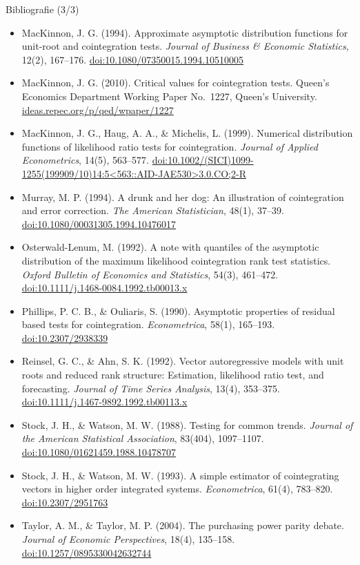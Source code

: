 \begin{frame}{Bibliografie (3/3)}
\itemsize{\scriptsize}
\begin{itemize}
    \item MacKinnon, J. G. (1994). Approximate asymptotic distribution functions for unit-root and cointegration tests. \textit{Journal of Business \& Economic Statistics}, 12(2), 167--176. \href{https://doi.org/10.1080/07350015.1994.10510005}{doi:10.1080/07350015.1994.10510005}
    \item MacKinnon, J. G. (2010). Critical values for cointegration tests. Queen's Economics Department Working Paper No.~1227, Queen's University. \href{https://ideas.repec.org/p/qed/wpaper/1227.html}{ideas.repec.org/p/qed/wpaper/1227}
    \item MacKinnon, J. G., Haug, A. A., \& Michelis, L. (1999). Numerical distribution functions of likelihood ratio tests for cointegration. \textit{Journal of Applied Econometrics}, 14(5), 563--577. \href{https://doi.org/10.1002/(SICI)1099-1255(199909/10)14:5<563::AID-JAE530>3.0.CO;2-R}{doi:10.1002/(SICI)1099-1255(199909/10)14:5<563::AID-JAE530>3.0.CO;2-R}
    \item Murray, M. P. (1994). A drunk and her dog: An illustration of cointegration and error correction. \textit{The American Statistician}, 48(1), 37--39. \href{https://doi.org/10.1080/00031305.1994.10476017}{doi:10.1080/00031305.1994.10476017}
    \item Osterwald-Lenum, M. (1992). A note with quantiles of the asymptotic distribution of the maximum likelihood cointegration rank test statistics. \textit{Oxford Bulletin of Economics and Statistics}, 54(3), 461--472. \href{https://doi.org/10.1111/j.1468-0084.1992.tb00013.x}{doi:10.1111/j.1468-0084.1992.tb00013.x}
    \item Phillips, P. C. B., \& Ouliaris, S. (1990). Asymptotic properties of residual based tests for cointegration. \textit{Econometrica}, 58(1), 165--193. \href{https://doi.org/10.2307/2938339}{doi:10.2307/2938339}
    \item Reinsel, G. C., \& Ahn, S. K. (1992). Vector autoregressive models with unit roots and reduced rank structure: Estimation, likelihood ratio test, and forecasting. \textit{Journal of Time Series Analysis}, 13(4), 353--375. \href{https://doi.org/10.1111/j.1467-9892.1992.tb00113.x}{doi:10.1111/j.1467-9892.1992.tb00113.x}
    \item Stock, J. H., \& Watson, M. W. (1988). Testing for common trends. \textit{Journal of the American Statistical Association}, 83(404), 1097--1107. \href{https://doi.org/10.1080/01621459.1988.10478707}{doi:10.1080/01621459.1988.10478707}
    \item Stock, J. H., \& Watson, M. W. (1993). A simple estimator of cointegrating vectors in higher order integrated systems. \textit{Econometrica}, 61(4), 783--820. \href{https://doi.org/10.2307/2951763}{doi:10.2307/2951763}
    \item Taylor, A. M., \& Taylor, M. P. (2004). The purchasing power parity debate. \textit{Journal of Economic Perspectives}, 18(4), 135--158. \href{https://doi.org/10.1257/0895330042632744}{doi:10.1257/0895330042632744}
\end{itemize}
\end{frame}


